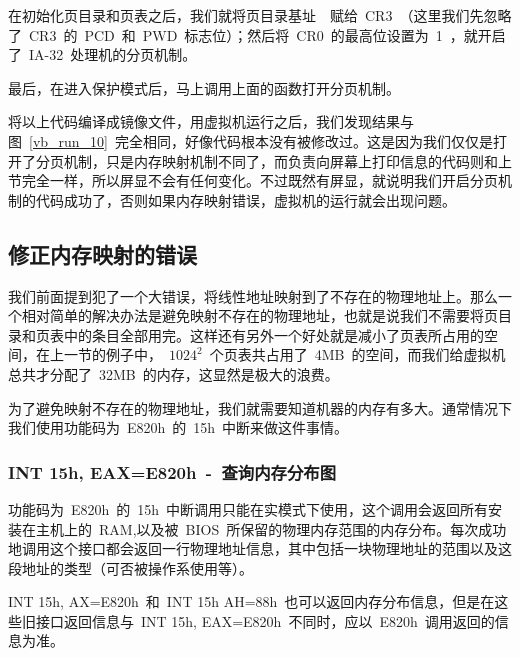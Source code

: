 在初始化页目录和页表之后，我们就将页目录基址~~赋给~CR3~（这里我们先忽略了~CR3~的~PCD~和~PWD~标志位）；然后将~CR0~的最高位设置为~1~，就开启了~IA-32~处理机的分页机制。

最后，在进入保护模式后，马上调用上面的函数打开分页机制。


将以上代码编译成镜像文件，用虚拟机运行之后，我们发现结果与图~\ref{vb_run_10}~完全相同，好像代码根本没有被修改过。这是因为我们仅仅是打开了分页机制，只是内存映射机制不同了，而负责向屏幕上打印信息的代码则和上节完全一样，所以屏显不会有任何变化。不过既然有屏显，就说明我们开启分页机制的代码成功了，否则如果内存映射错误，虚拟机的运行就会出现问题。

\subsection{修正内存映射的错误}

我们前面提到犯了一个大错误，将线性地址映射到了不存在的物理地址上。那么一个相对简单的解决办法是避免映射不存在的物理地址，也就是说我们不需要将页目录和页表中的条目全部用完。这样还有另外一个好处就是减小了页表所占用的空间，在上一节的例子中，~$1024^2$~个页表共占用了~4MB~的空间，而我们给虚拟机总共才分配了~32MB~的内存，这显然是极大的浪费。

为了避免映射不存在的物理地址，我们就需要知道机器的内存有多大。通常情况下我们使用功能码为~E820h~的~15h~中断来做这件事情。

\subsubsection{INT 15h, EAX=E820h~-~查询内存分布图}

功能码为~E820h~的~15h~中断调用只能在实模式下使用，这个调用会返回所有安装在主机上的~RAM,以及被~BIOS~所保留的物理内存范围的内存分布。每次成功地调用这个接口都会返回一行物理地址信息，其中包括一块物理地址的范围以及这段地址的类型（可否被操作系使用等）。

INT 15h, AX=E820h~和~INT 15h AH=88h~也可以返回内存分布信息，但是在这些旧接口返回信息与~INT 15h, EAX=E820h~不同时，应以~E820h~调用返回的信息为准。

